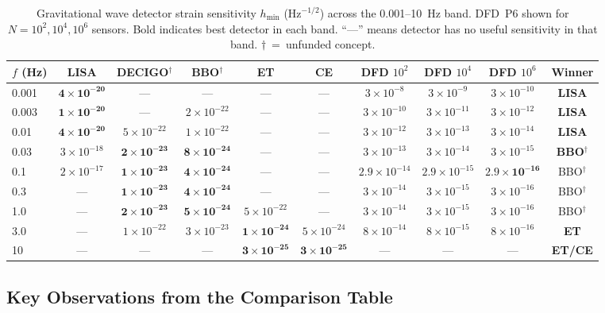 \documentclass[11pt]{article}
\theoremstyle{definition}
\theoremstyle{remark}
\newcommand{\ee}[1]{\times10^{#1}}
\begin{document}
\begin{table}[H]
\centering
\caption{Gravitational wave detector strain sensitivity $h_{\min}$
($\mathrm{Hz}^{-1/2}$) across the 0.001--10~Hz band. DFD~P6 shown for
$N = 10^2, 10^4, 10^6$ sensors. Bold indicates best detector in each band.
``---'' means detector has no useful sensitivity in that band.
$\dagger$~=~unfunded concept.}
\label{tab:P6-comparison}
\small
\begin{tabular}{@{}lccccccccc@{}}
\toprule
$f$ (Hz) & LISA & DECIGO$^\dagger$ & BBO$^\dagger$ & ET & CE
  & DFD $10^2$ & DFD $10^4$ & DFD $10^6$ & Winner \\
\midrule
0.001 & $\mathbf{4\ee{-20}}$ & --- & --- & --- & ---
  & $3\ee{-8}$ & $3\ee{-9}$ & $3\ee{-10}$
  & \textbf{LISA} \\[3pt]
0.003 & $\mathbf{1\ee{-20}}$ & --- & $2\ee{-22}$ & --- & ---
  & $3\ee{-10}$ & $3\ee{-11}$ & $3\ee{-12}$
  & \textbf{LISA} \\[3pt]
0.01 & $\mathbf{4\ee{-20}}$ & $5\ee{-22}$ & $1\ee{-22}$ & --- & ---
  & $3\ee{-12}$ & $3\ee{-13}$ & $3\ee{-14}$
  & \textbf{LISA} \\[3pt]
0.03 & $3\ee{-18}$ & $\mathbf{2\ee{-23}}$ & $\mathbf{8\ee{-24}}$ & --- & ---
  & $3\ee{-13}$ & $3\ee{-14}$ & $3\ee{-15}$
  & \textbf{BBO$^\dagger$} \\[3pt]
0.1 & $2\ee{-17}$ & $\mathbf{1\ee{-23}}$ & $\mathbf{4\ee{-24}}$ & --- & ---
  & $2.9\ee{-14}$ & $2.9\ee{-15}$ & $\mathbf{2.9\ee{-16}}$
  & BBO$^\dagger$ \\[3pt]
0.3 & --- & $\mathbf{1\ee{-23}}$ & $\mathbf{4\ee{-24}}$ & --- & ---
  & $3\ee{-14}$ & $3\ee{-15}$ & $3\ee{-16}$
  & BBO$^\dagger$ \\[3pt]
1.0 & --- & $\mathbf{2\ee{-23}}$ & $\mathbf{5\ee{-24}}$ & $5\ee{-22}$ & ---
  & $3\ee{-14}$ & $3\ee{-15}$ & $3\ee{-16}$
  & BBO$^\dagger$ \\[3pt]
3.0 & --- & $1\ee{-22}$ & $3\ee{-23}$ & $\mathbf{1\ee{-24}}$ & $5\ee{-24}$
  & $8\ee{-14}$ & $8\ee{-15}$ & $8\ee{-16}$
  & \textbf{ET} \\[3pt]
10 & --- & --- & --- & $\mathbf{3\ee{-25}}$ & $\mathbf{3\ee{-25}}$
  & --- & --- & ---
  & \textbf{ET/CE} \\
\bottomrule
\end{tabular}
\end{table}

\subsection{Key Observations from the Comparison Table}
\end{document}

